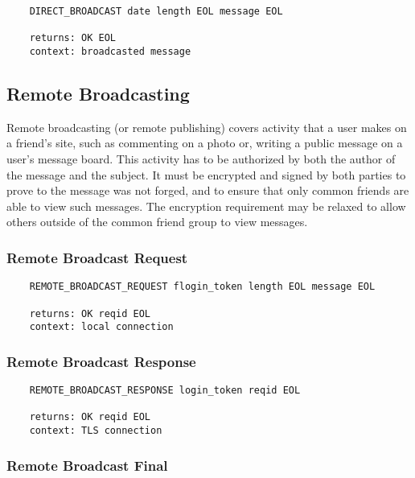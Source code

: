\documentclass[letterpaper,11pt,oneside]{article}
\begin{document}
\vspace{10pt}
\begin{verbatim}
    DIRECT_BROADCAST date length EOL message EOL

    returns: OK EOL
    context: broadcasted message
\end{verbatim}

\subsection{Remote Broadcasting}

Remote broadcasting (or remote publishing) covers activity that a user makes on
a friend's site, such as commenting on a photo or, writing a public message on
a user's message board. This activity has to be authorized by both the author
of the message and the subject. It must be encrypted and signed by both parties
to prove to the message was not forged, and to ensure that only common friends
are able to view such messages. The encryption requirement may be relaxed to
allow others outside of the common friend group to view messages.

\subsubsection{Remote Broadcast Request}

\vspace{10pt}
\begin{verbatim}
    REMOTE_BROADCAST_REQUEST flogin_token length EOL message EOL

    returns: OK reqid EOL
    context: local connection
\end{verbatim}
\vspace{10pt}

\subsubsection{Remote Broadcast Response}

\vspace{10pt}
\begin{verbatim}
    REMOTE_BROADCAST_RESPONSE login_token reqid EOL 

    returns: OK reqid EOL
    context: TLS connection
\end{verbatim}
\vspace{10pt}

\subsubsection{Remote Broadcast Final}
\end{document}
